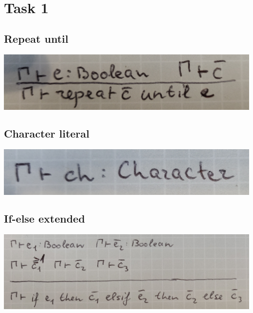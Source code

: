\documentclass{article}
\begin{document}
\tableofcontents

\newpage

\section{Task 1}

\subsection{Repeat until}

\begin{center}
  \includegraphics[scale=0.1]{repeat_type.jpg}
\end{center}


\subsection{Character literal}

\begin{center}
  \includegraphics[scale=0.1]{char_type.jpg}
\end{center}


\subsection{If-else extended}

\begin{center}
  \includegraphics[scale=0.1]{if-else_type.jpg}
\end{center}
\end{document}
